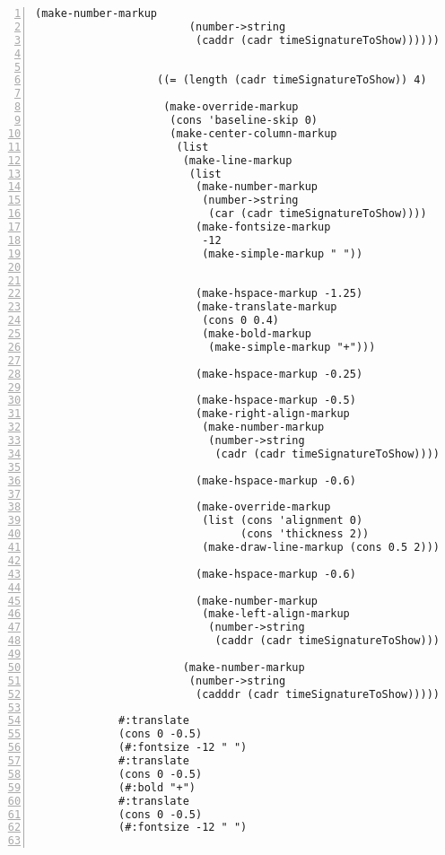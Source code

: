 \begin{Verbatim}[numbers=left,xleftmargin=5mm]
                       (make-number-markup
                        (number->string
                         (caddr (cadr timeSignatureToShow))))))))


                   ((= (length (cadr timeSignatureToShow)) 4)

                    (make-override-markup
                     (cons 'baseline-skip 0)
                     (make-center-column-markup
                      (list
                       (make-line-markup
                        (list
                         (make-number-markup
                          (number->string
                           (car (cadr timeSignatureToShow))))
                         (make-fontsize-markup
                          -12
                          (make-simple-markup " "))


                         (make-hspace-markup -1.25)
                         (make-translate-markup
                          (cons 0 0.4)
                          (make-bold-markup
                           (make-simple-markup "+")))

                         (make-hspace-markup -0.25)

                         (make-hspace-markup -0.5)
                         (make-right-align-markup
                          (make-number-markup
                           (number->string
                            (cadr (cadr timeSignatureToShow)))))

                         (make-hspace-markup -0.6)

                         (make-override-markup
                          (list (cons 'alignment 0)
                                (cons 'thickness 2))
                          (make-draw-line-markup (cons 0.5 2)))

                         (make-hspace-markup -0.6)

                         (make-number-markup
                          (make-left-align-markup
                           (number->string
                            (caddr (cadr timeSignatureToShow)))))))

                       (make-number-markup
                        (number->string
                         (cadddr (cadr timeSignatureToShow)))))))))

             #:translate
             (cons 0 -0.5)
             (#:fontsize -12 " ")
             #:translate
             (cons 0 -0.5)
             (#:bold "+")
             #:translate
             (cons 0 -0.5)
             (#:fontsize -12 " ")


\end{Verbatim}
